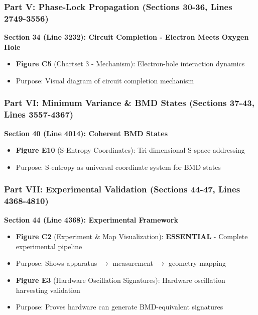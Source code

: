 \documentclass[11pt]{article}
\begin{document}
\subsubsection{Part V: Phase-Lock Propagation (Sections 30-36, Lines 2749-3556)}

\textbf{Section 34 (Line 3232): Circuit Completion - Electron Meets Oxygen Hole}
\begin{itemize}
\item \textbf{Figure C5} (Chartset 3 - Mechanism): Electron-hole interaction dynamics
\item Purpose: Visual diagram of circuit completion mechanism
\end{itemize}

\subsubsection{Part VI: Minimum Variance \& BMD States (Sections 37-43, Lines 3557-4367)}

\textbf{Section 40 (Line 4014): Coherent BMD States}
\begin{itemize}
\item \textbf{Figure E10} (S-Entropy Coordinates): Tri-dimensional S-space addressing
\item Purpose: S-entropy as universal coordinate system for BMD states
\end{itemize}

\subsubsection{Part VII: Experimental Validation (Sections 44-47, Lines 4368-4810)}

\textbf{Section 44 (Line 4368): Experimental Framework}
\begin{itemize}
\item \textbf{Figure C2} (Experiment \& Map Visualization): \textbf{ESSENTIAL} - Complete experimental pipeline
\item Purpose: Shows apparatus $\to$ measurement $\to$ geometry mapping
\item \textbf{Figure E3} (Hardware Oscillation Signatures): Hardware oscillation harvesting validation
\item Purpose: Proves hardware can generate BMD-equivalent signatures
\end{itemize}
\end{document}
